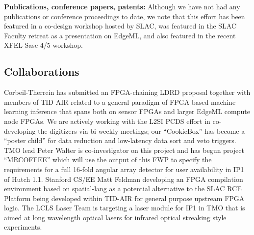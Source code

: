 \documentclass[aps]{revtex4}
\begin{document}
%





\textbf{Publications, conference papers, patents: }
Although we have not had any publications or conference proceedings to date, we note that this effort has been featured in a co-design workshop hosted by SLAC, was featured in the SLAC Faculty retreat as a presentation on EdgeML, and also featured in the recent XFEL Sase 4/5 workshop.


\subsection*{Collaborations }
Corbeil-Therrein has submitted an FPGA-chaining LDRD proposal together with members of TID-AIR related to a general paradigm of FPGA-based machine learning inference that spans both on sensor FPGAs and larger EdgeML compute node FPGAs.
We are actively working with the L2SI PCDS effort in co-developing the digitizers via bi-weekly meetings; our ``CookieBox'' has become a ``poster child'' for data reduction and low-latency data sort and veto triggers.
TMO lead Peter Walter is co-investigator on this project and has begun project ``MRCOFFEE'' which will use the output of this FWP to specify the requirements for a full 16-fold angular array detector for user availability in IP1 of Hutch 1.1.
Stanford CS/EE Matt Feldman developing an FPGA compilation environment based on spatial-lang as a potential alternative to the SLAC RCE Platform being developed within TID-AIR for general purpose upstream  FPGA logic.
The LCLS Laser Team is targeting a laser module for IP1 in TMO that is aimed at long wavelength optical lasers for infrared optical streaking style experiments.
\end{document}
